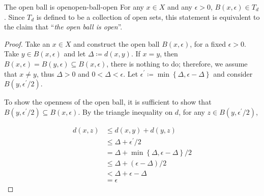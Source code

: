 \documentclass{article}
\numberwithin{equation}{section}
\numberwithin{figure}{section}
\begin{document}
\begin{theorem}{The open ball is open}{open-ball-open}
    For any $ x \in X $ and any $ \epsilon > 0 $, $ B(x, \epsilon) \in T_d $.
    Since $ T_d $ is defined to be a collection of open sets, this statement is
    equivalent to the claim that ``\emph{the open ball is open}''.
    \begin{proof}
        Take an $ x \in X $ and construct the open ball $ B(x, \epsilon) $, for
        a fixed $ \epsilon > 0 $. Take $ y \in B(x, \epsilon) $ and let $ \Delta
        \coloneq d(x, y) $. If $ x=y $, then $ B(x, \epsilon) = B(y, \epsilon)
        \subseteq B(x, \epsilon) $, there is nothing to do; therefore, we assume
        that $ x \neq y $, thus $ \Delta > 0 $ and $ 0 < \Delta < \epsilon $.
        Let $ \epsilon^\prime \coloneq \min\left\{ \Delta, \epsilon-\Delta
        \right\} $ and consider $ B(y, \epsilon^\prime/2) $.

        To show the openness of the open ball, it is sufficient to show that $
        B(y, \epsilon^\prime/2) \subseteq B(x, \epsilon) $. By the triangle
        inequality on $ d $, for any $ z \in B(y, \epsilon^\prime/2) $,

        \begin{minipage}{.45\linewidth}
            \begin{align}
                d(x, z) &\leq d(x, y) + d(y, z) \\
                &\leq \Delta + \epsilon^\prime/2 \\
                &= \Delta + \min\left\{\Delta, \epsilon-\Delta\right\}/2 \\
                &\leq \Delta + (\epsilon-\Delta)/2 \\
                &< \Delta + \epsilon - \Delta \\
                &= \epsilon
            \end{align}
        \end{minipage}\hfill
        \begin{minipage}{.5\linewidth}
            \centering
        \end{minipage}


\end{proof}
\end{theorem}
\end{document}
